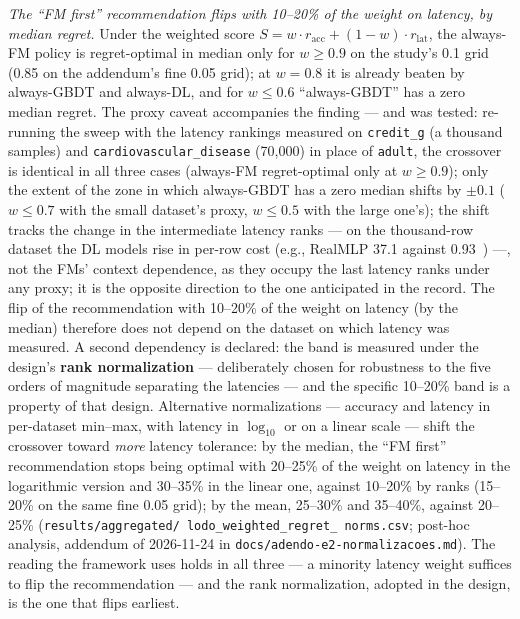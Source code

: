 \emph{The ``FM first'' recommendation flips with 10--20\% of the
weight on latency, by median regret.} Under the weighted score
$S = w \cdot r_{\text{acc}} + (1-w) \cdot r_{\text{lat}}$, the
always-FM policy is regret-optimal in median only for $w \geq 0.9$
on the study's 0.1 grid (0.85 on the addendum's fine 0.05 grid);
at $w{=}0.8$ it is already beaten by always-GBDT and always-DL, and
for $w \leq 0.6$ ``always-GBDT'' has a zero median regret. The proxy
caveat accompanies the finding --- and was tested: re-running the
sweep with the latency rankings measured on \texttt{credit\_g} (a
thousand samples) and
\texttt{cardiovascular\_\allowbreak disease} (70{,}000) in place of
\texttt{adult}, the crossover is identical in all three cases
(always-FM regret-optimal only at $w \geq 0.9$); only the extent of
the zone in which always-GBDT has a zero median shifts by
$\pm 0.1$ ($w \leq 0.7$ with the small dataset's proxy, $w \leq 0.5$
with the large one's); the shift tracks the change in the
intermediate latency ranks --- on the thousand-row dataset the DL
models rise in per-row cost (e.g., RealMLP 37.1 against
0.93~\us) ---, not the FMs' context dependence, as they occupy the
last latency ranks under any proxy; it is the opposite direction to
the one anticipated in the record. The flip of the recommendation with 10--20\% of the weight
on latency (by the median) therefore does not depend on the dataset
on which latency was measured. A second dependency is declared: the band is measured
under the design's \textbf{rank normalization} --- deliberately
chosen for robustness to the five orders of magnitude separating the
latencies --- and the specific 10--20\% band is a property of that
design. Alternative normalizations
--- accuracy and latency in per-dataset min--max, with latency in
$\log_{10}$ or on a linear scale --- shift the crossover toward
\emph{more} latency tolerance: by the median, the ``FM first''
recommendation stops being optimal with 20--25\% of the weight on
latency in the logarithmic version and 30--35\% in the linear one,
against 10--20\% by ranks (15--20\% on the same fine 0.05 grid);
by the mean, 25--30\% and 35--40\%, against 20--25\%
(\texttt{results/\allowbreak aggregated/\allowbreak
lodo\_\allowbreak weighted\_\allowbreak regret\_\allowbreak
norms.csv}; post-hoc analysis, addendum of 2026-11-24 in
\texttt{docs/\allowbreak adendo-e2-normalizacoes.md}). The reading
the framework uses holds in all three --- a minority latency weight
suffices to flip the recommendation --- and the rank normalization,
adopted in the design, is the one that flips earliest.


